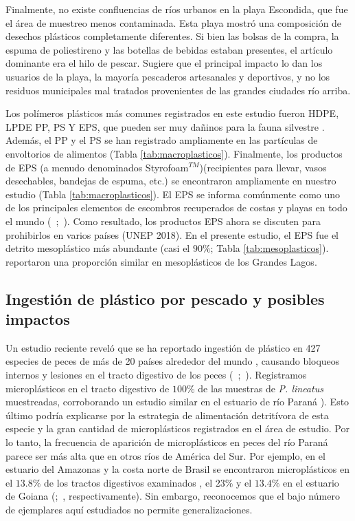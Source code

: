 Finalmente, no existe confluencias de ríos urbanos en la playa Escondida, que fue el área de muestreo menos contaminada. Esta playa mostró una composición de desechos plásticos completamente diferentes. Si bien las bolsas de la compra, la espuma de poliestireno y las botellas de bebidas estaban presentes, el artículo dominante era el hilo de pescar. Sugiere que el principal impacto lo dan los usuarios de la playa, la mayoría pescaderos artesanales y deportivos, y no los residuos municipales mal tratados provenientes de las grandes ciudades río arriba.

Los polímeros plásticos más comunes registrados en este estudio fueron HDPE, LPDE PP, PS Y EPS, que pueden ser muy dañinos para la fauna silvestre \parencite{Kyaw2012}. Además, el PP y el PS se han registrado ampliamente en las partículas de envoltorios de alimentos (Tabla \ref{tab:macroplasticos}). Finalmente, los productos de EPS (a menudo denominados Styrofoam$^{TM}$)(recipientes para llevar, vasos desechables, bandejas de espuma, etc.) se encontraron ampliamente en nuestro estudio (Tabla \ref{tab:macroplasticos}). El EPS se informa comúnmente como uno de los principales elementos de escombros recuperados de costas y playas en todo el mundo (~\cite{LEE2013349};~\cite{ocean}). Como resultado, los productos EPS ahora se discuten para prohibirlos en varios países (UNEP 2018). En el presente estudio, el EPS fue el detrito mesoplástico más abundante (casi el $90\%$; Tabla \ref{tab:mesoplasticos}).~\cite{ZBYSZEWSKI2014288} reportaron una proporción similar en mesoplásticos de los Grandes Lagos.

\subsection{Ingestión de plástico por pescado y posibles impactos}

Un estudio reciente reveló que se ha reportado ingestión de plástico en 427 especies de peces de más de 20 países alrededor del mundo \parencite{Azevedo-Santos2019}, causando bloqueos internos y lesiones en el tracto digestivo de los peces (~\cite{CANNON2016286};~\cite{NADAL2016517}). Registramos microplásticos en el tracto digestivo de $100\%$ de las muestras de \textit{P. lineatus} muestreadas, corroborando un estudio similar en el estuario de río Paraná \parencite{PAZOS201785}). Esto último podría explicarse por la estrategia de alimentación detritívora de esta especie y la gran cantidad de microplásticos registrados en el área de estudio. Por lo tanto, la frecuencia de aparición de microplásticos en peces del río Paraná parece ser más alta que en otros ríos de América del Sur. Por ejemplo, en el estuario del Amazonas y la costa norte de Brasil se encontraron microplásticos en el $13.8\%$ de los tractos digestivos examinados \parencite{Pegado2018}, el $23\%$ y el $13.4\%$ en el estuario de Goiana (\cite{POSSATTO20111098};~\cite{Ramos2012}, respectivamente). Sin embargo, reconocemos que el bajo número de ejemplares aquí estudiados no permite generalizaciones.

